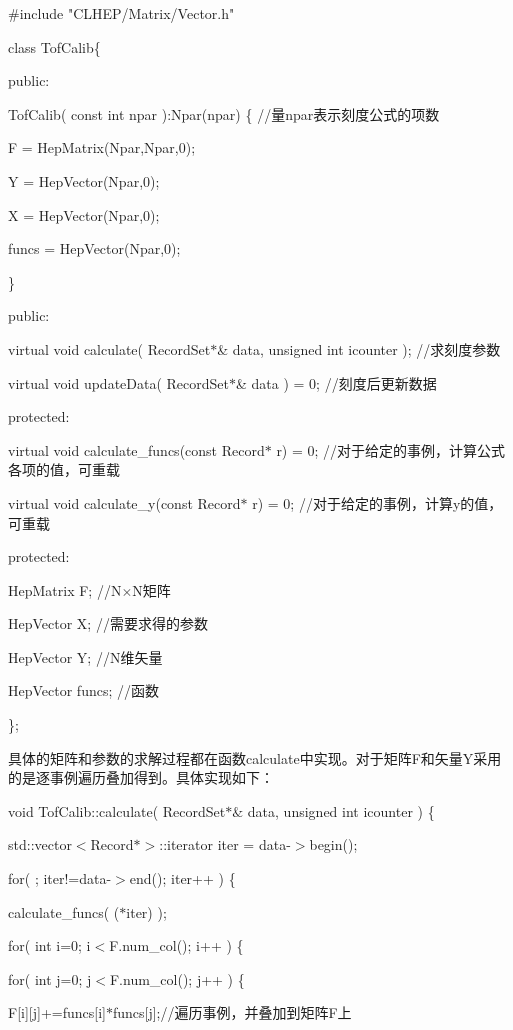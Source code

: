 \#include "CLHEP/Matrix/Vector.h"

class TofCalib\{

 public:

\quad  TofCalib( const int npar ):Npar(npar) \{  //量npar表示刻度公式的项数

\quad\quad    F = HepMatrix(Npar,Npar,0);

\quad\quad    Y = HepVector(Npar,0);

\quad\quad    X = HepVector(Npar,0);

\quad\quad    funcs = HepVector(Npar,0);

\quad  \}

 public:

\quad  virtual void calculate( RecordSet$*$\& data, unsigned int icounter ); //求刻度参数

\quad virtual void updateData( RecordSet$*$\& data ) = 0;   //刻度后更新数据

 protected:

\quad  virtual void calculate\_funcs(const Record$*$ r) = 0;           //对于给定的事例，计算公式各项的值，可重载

\quad  virtual void calculate\_y(const Record$*$ r) = 0;               //对于给定的事例，计算y的值，可重载        

 protected:

\quad  HepMatrix F;                    //N$\times$N矩阵

\quad  HepVector X;                    //需要求得的参数

\quad  HepVector Y;                    //N维矢量

\quad  HepVector funcs;                //函数

\};

具体的矩阵和参数的求解过程都在函数calculate中实现。对于矩阵F和矢量Y采用的是逐事例遍历叠加得到。具体实现如下：

void TofCalib::calculate( RecordSet$*\&$ data, unsigned int icounter ) \{

\quad std::vector$<$Record$*$$>$::iterator iter = data-$>$begin();

\quad\quad    for( ; iter!=data-$>$end(); iter++ ) \{

\quad\quad\quad      calculate\_funcs( ($*$iter) );

\quad\quad\quad      for( int i=0; i$<$F.num\_col(); i++ ) \{

\quad\quad\quad\quad       for( int j=0; j$<$F.num\_col(); j++ ) \{

\quad\quad\quad\quad\quad          F[i][j]+=funcs[i]$*$funcs[j];//遍历事例，并叠加到矩阵F上

